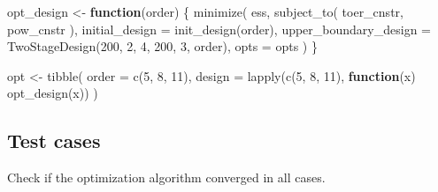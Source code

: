 \documentclass[
]{book}
\newenvironment{Shaded}{\begin{snugshade}}{\end{snugshade}}
\newcommand{\AttributeTok}[1]{\textcolor[rgb]{0.77,0.63,0.00}{#1}}
\newcommand{\ControlFlowTok}[1]{\textcolor[rgb]{0.13,0.29,0.53}{\textbf{#1}}}
\newcommand{\DecValTok}[1]{\textcolor[rgb]{0.00,0.00,0.81}{#1}}
\newcommand{\FunctionTok}[1]{\textcolor[rgb]{0.00,0.00,0.00}{#1}}
\newcommand{\NormalTok}[1]{#1}
\newcommand{\OtherTok}[1]{\textcolor[rgb]{0.56,0.35,0.01}{#1}}
\newcommand{\SpecialCharTok}[1]{\textcolor[rgb]{0.00,0.00,0.00}{#1}}
\begin{document}
\begin{Shaded}
\begin{Highlighting}[]
\NormalTok{opt\_design }\OtherTok{\textless{}{-}} \ControlFlowTok{function}\NormalTok{(order) \{}
    \FunctionTok{minimize}\NormalTok{(}
\NormalTok{        ess,}
        \FunctionTok{subject\_to}\NormalTok{(}
\NormalTok{            toer\_cnstr,}
\NormalTok{            pow\_cnstr}
\NormalTok{        ),}
        \AttributeTok{initial\_design =} \FunctionTok{init\_design}\NormalTok{(order),}
        \AttributeTok{upper\_boundary\_design =} \FunctionTok{TwoStageDesign}\NormalTok{(}\DecValTok{200}\NormalTok{, }\DecValTok{2}\NormalTok{, }\DecValTok{4}\NormalTok{, }\DecValTok{200}\NormalTok{, }\DecValTok{3}\NormalTok{, order),}
        \AttributeTok{opts =}\NormalTok{ opts}
\NormalTok{    )}
\NormalTok{\}}

\NormalTok{opt }\OtherTok{\textless{}{-}} \FunctionTok{tibble}\NormalTok{(}
  \AttributeTok{order  =} \FunctionTok{c}\NormalTok{(}\DecValTok{5}\NormalTok{, }\DecValTok{8}\NormalTok{, }\DecValTok{11}\NormalTok{),}
  \AttributeTok{design =} \FunctionTok{lapply}\NormalTok{(}\FunctionTok{c}\NormalTok{(}\DecValTok{5}\NormalTok{, }\DecValTok{8}\NormalTok{, }\DecValTok{11}\NormalTok{), }\ControlFlowTok{function}\NormalTok{(x) }\FunctionTok{opt\_design}\NormalTok{(x))}
\NormalTok{)}
\end{Highlighting}
\end{Shaded}

\hypertarget{test-cases-10}{%
\subsection{Test cases}\label{test-cases-10}}

Check if the optimization algorithm converged in all cases.

\begin{Shaded}
\end{Shaded}
\end{document}
